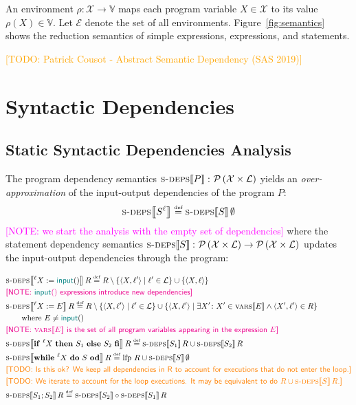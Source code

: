 \documentclass{article}
\newcommand{\defined}{\ensuremath{\stackrel{\mbox{\tiny def}}{=}}\xspace} %
\newcommand{\vars}{\ensuremath{\mathcal{X}}\xspace} %
\newcommand{\vals}{\ensuremath{\mathbb{V}}\xspace} %
\newcommand{\ipt}{\ensuremath{\mathbf{\mathsf{\color{teal}input}}()}\xspace} %
\newcommand{\powerset}[1]{\ensuremath{\mathcal{P}\left(#1\right)}\xspace} %
\newcommand{\tuple}[2]{\ensuremath{\langle #1, #2 \rangle}\xspace} %
\newcommand{\lfp}{\ensuremath{\mathrm{lfp}}\xspace} %
\newcommand{\labels}{\ensuremath{\mathcal{L}}\xspace} %
\newcommand{\envs}{\ensuremath{\mathcal{E}}\xspace} %
\newcommand{\semantics}[1]{\ensuremath{\left\llbracket #1 \right\rrbracket}\xspace} %
\newcommand{\sdeps}[1]{\ensuremath{\textsc{s-deps}\!\semantics{#1}}\xspace} %
\newcommand{\ids}[1]{\ensuremath{\textsc{vars}\!\semantics{#1}}\xspace} %
\newcommand{\irem}[3]{{\noindent\textcolor{#1}{\textsf{[#2: 
#3]}}}}
\newcommand{\todo}[1]{\irem{orange}{TODO}{#1}}
\newcommand{\note}[1]{\irem{magenta}{NOTE}{#1}}
\begin{document}
An environment $\rho\colon \vars \rightarrow \vals$ maps each program variable $X \in \vars$ to its value $\rho(X) \in \vals$. Let \envs denote the set of all environments. 
Figure~\ref{fig:semantics} shows the reduction semantics of simple expressions, expressions, and statements.

\todo{Patrick Cousot - Abstract Semantic Dependency (SAS 2019)}

\section*{Syntactic Dependencies}

\subsection*{Static Syntactic Dependencies Analysis}

The program dependency semantics $\sdeps{P} \colon \powerset{\vars \times \labels}$ yields an \emph{over-approximation} of the input-output dependencies of the program $P$:
\begin{equation*}
\sdeps{S^\ell{}} \defined \sdeps{S}\emptyset
\end{equation*}
\note{we start the analysis with the empty set of dependencies}
where the statement dependency semantics $\sdeps{S} \colon \powerset{\vars \times \labels} \rightarrow  \powerset{\vars \times \labels}$ updates the input-output dependencies through the program:

	\begin{align*}
	&\sdeps{^\ell{}X := \ipt}R \defined R \setminus \{ \tuple{X}{\ell{}'} \mid \ell{}' \in \labels \} \cup \{ \tuple{X}{\ell{}} \} 
	\\
	&\mbox{\note{\ipt expressions introduce new dependencies}} \\
	&\sdeps{^\ell{}X := E}R \defined R \setminus \{ \tuple{X}{\ell{}'} \mid \ell{}' \in \labels \} \cup \{ \tuple{X}{\ell{}'} \mid \exists X'\colon X' \in \ids{E} \land \tuple{X'}{\ell{}'} \in R \} \\
	&\qquad\mbox{where $E \not= \ipt$} \\
	&\mbox{\note{\ids{E} is the set of all program variables appearing in the expression $E$}} \\
%
	&\sdeps{\mathsf{\mathbf{if}}~^\ell{}X~\mathsf{\mathbf{then}}~S_1~\mathsf{\mathbf{else}}~S_2~\mathsf{\mathbf{fi}}}R
	 \defined \sdeps{S_1}R \cup \sdeps{S_2}R \\ 
%
&\sdeps{\mathsf{\mathbf{while}}~^\ell{}X~\mathsf{\mathbf{do}}~S~\mathsf{\mathbf{od}}}R
\defined \lfp~R \cup \sdeps{S}\emptyset  \\
&\todo{Is this ok? We keep all dependencies in R to account for executions that do not enter the loop.} \\
&\todo{We iterate to account for the loop executions. It may be equivalent to do $R \cup \sdeps{S}R$.} \\
%
&\sdeps{S_1; S_2}R \defined \sdeps{S_2} \circ 
\sdeps{S_1}R
	\end{align*}
\end{document}
